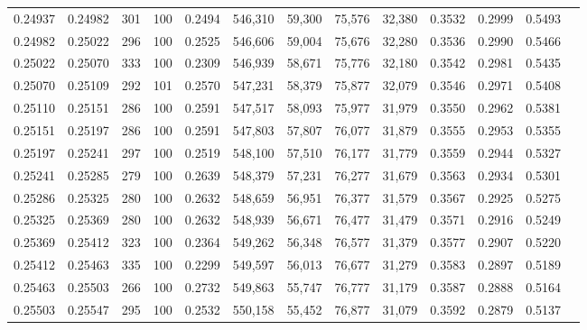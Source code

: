 \begin{tabular}{rrrrrrrrrrrrr}
0.24937 & 0.24982 &   301 & 100 &                                     0.2494 & 546,310 &  59,300 &  75,576 &  32,380 & 0.3532 & 0.2999 & 0.5493 \\
0.24982 & 0.25022 &   296 & 100 &                                     0.2525 & 546,606 &  59,004 &  75,676 &  32,280 & 0.3536 & 0.2990 & 0.5466 \\
0.25022 & 0.25070 &   333 & 100 &                                     0.2309 & 546,939 &  58,671 &  75,776 &  32,180 & 0.3542 & 0.2981 & 0.5435 \\
0.25070 & 0.25109 &   292 & 101 &                                     0.2570 & 547,231 &  58,379 &  75,877 &  32,079 & 0.3546 & 0.2971 & 0.5408 \\
0.25110 & 0.25151 &   286 & 100 &                                     0.2591 & 547,517 &  58,093 &  75,977 &  31,979 & 0.3550 & 0.2962 & 0.5381 \\
0.25151 & 0.25197 &   286 & 100 &                                     0.2591 & 547,803 &  57,807 &  76,077 &  31,879 & 0.3555 & 0.2953 & 0.5355 \\
0.25197 & 0.25241 &   297 & 100 &                                     0.2519 & 548,100 &  57,510 &  76,177 &  31,779 & 0.3559 & 0.2944 & 0.5327 \\
0.25241 & 0.25285 &   279 & 100 &                                     0.2639 & 548,379 &  57,231 &  76,277 &  31,679 & 0.3563 & 0.2934 & 0.5301 \\
0.25286 & 0.25325 &   280 & 100 &                                     0.2632 & 548,659 &  56,951 &  76,377 &  31,579 & 0.3567 & 0.2925 & 0.5275 \\
0.25325 & 0.25369 &   280 & 100 &                                     0.2632 & 548,939 &  56,671 &  76,477 &  31,479 & 0.3571 & 0.2916 & 0.5249 \\
0.25369 & 0.25412 &   323 & 100 &                                     0.2364 & 549,262 &  56,348 &  76,577 &  31,379 & 0.3577 & 0.2907 & 0.5220 \\
0.25412 & 0.25463 &   335 & 100 &                                     0.2299 & 549,597 &  56,013 &  76,677 &  31,279 & 0.3583 & 0.2897 & 0.5189 \\
0.25463 & 0.25503 &   266 & 100 &                                     0.2732 & 549,863 &  55,747 &  76,777 &  31,179 & 0.3587 & 0.2888 & 0.5164 \\
0.25503 & 0.25547 &   295 & 100 &                                     0.2532 & 550,158 &  55,452 &  76,877 &  31,079 & 0.3592 & 0.2879 & 0.5137 \\

\end{tabular}
